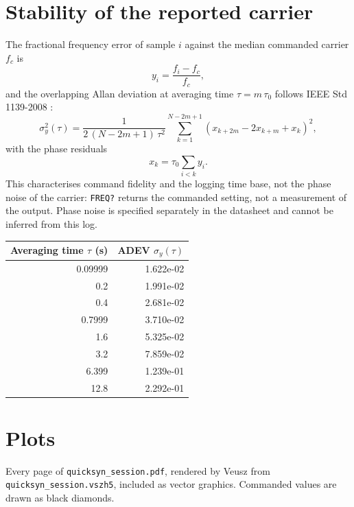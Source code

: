 \documentclass[11pt]{article}
\begin{document}
\section{Stability of the reported carrier}

The fractional frequency error of sample $i$ against the median
commanded carrier $f_c$ is
\begin{equation}
  y_i = \frac{f_i - f_c}{f_c},
\end{equation}
and the overlapping Allan deviation at averaging time $\tau = m\,\tau_0$
follows IEEE Std 1139-2008 \cite{ieee1139}:
\begin{equation}
  \sigma_y^2(\tau) = \frac{1}{2\,(N-2m+1)\,\tau^2}
  \sum_{k=1}^{N-2m+1}\left(x_{k+2m} - 2x_{k+m} + x_k\right)^2,
\end{equation}
with the phase residuals
\begin{equation}
  x_k = \tau_0 \sum_{i<k} y_i .
\end{equation}
This characterises command fidelity and the logging time base, not the
phase noise of the carrier: \texttt{FREQ?} returns the commanded setting,
not a measurement of the output. Phase noise is specified separately in
the datasheet \cite{nidatasheet} and cannot be inferred from this log.

\begin{center}
\begin{tabular}{@{}rr@{}}
\toprule
\textbf{Averaging time $\tau$ (s)} & \textbf{ADEV $\sigma_y(\tau)$} \\
\midrule
0.09999 & 1.622e-02 \\
0.2 & 1.991e-02 \\
0.4 & 2.681e-02 \\
0.7999 & 3.710e-02 \\
1.6 & 5.325e-02 \\
3.2 & 7.859e-02 \\
6.399 & 1.239e-01 \\
12.8 & 2.292e-01 \\
\bottomrule
\end{tabular}
\end{center}

\clearpage
\section{Plots}

Every page of \texttt{quicksyn\_session.pdf}, rendered by
Veusz \cite{veusz} from \texttt{quicksyn\_session.vszh5}, included as vector
graphics. Commanded values are drawn as black diamonds.
\end{document}
